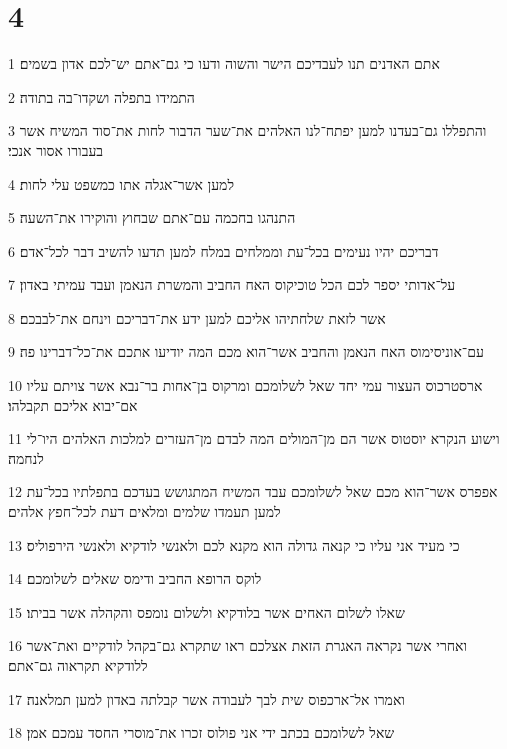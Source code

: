 \chapter{4}

\par 1 אתם האדנים תנו לעבדיכם הישר והשוה ודעו כי גם־אתם יש־לכם אדון בשמים׃
\par 2 התמידו בתפלה ושקדו־בה בתודה׃
\par 3 והתפללו גם־בעדנו למען יפתח־לנו האלהים את־שער הדבור לחות את־סוד המשיח אשר בעבורו אסור אנכי׃
\par 4 למען אשר־אגלה אתו כמשפט עלי לחות׃
\par 5 התנהגו בחכמה עם־אתם שבחוץ והוקירו את־השעה׃
\par 6 דבריכם יהיו נעימים בכל־עת וממלחים במלח למען תדעו להשיב דבר לכל־אדם׃
\par 7 על־אדותי יספר לכם הכל טוכיקוס האח החביב והמשרת הנאמן ועבד עמיתי באדון׃
\par 8 אשר לזאת שלחתיהו אליכם למען ידע את־דבריכם וינחם את־לבבכם׃
\par 9 עם־אוניסימוס האח הנאמן והחביב אשר־הוא מכם המה יודיעו אתכם את־כל־דברינו פה׃
\par 10 ארסטרכוס העצור עמי יחד שאל לשלומכם ומרקוס בן־אחות בר־נבא אשר צויתם עליו אם־יבוא אליכם תקבלהו׃
\par 11 וישוע הנקרא יוסטוס אשר הם מן־המולים המה לבדם מן־העזרים למלכות האלהים היו־לי לנחמה׃
\par 12 אפפרס אשר־הוא מכם שאל לשלומכם עבד המשיח המתגושש בעדכם בתפלתיו בכל־עת למען תעמדו שלמים ומלאים דעת לכל־חפץ אלהים׃
\par 13 כי מעיד אני עליו כי קנאה גדולה הוא מקנא לכם ולאנשי לודקיא ולאנשי הירפוליס׃
\par 14 לוקס הרופא החביב ודימס שאלים לשלומכם׃
\par 15 שאלו לשלום האחים אשר בלודקיא ולשלום נומפס והקהלה אשר בביתו׃
\par 16 ואחרי אשר נקראה האגרת הזאת אצלכם ראו שתקרא גם־בקהל לודקיים ואת־אשר ללודקיא תקראוה גם־אתם׃
\par 17 ואמרו אל־ארכפוס שית לבך לעבודה אשר קבלתה באדון למען תמלאנה׃
\par 18 שאל לשלומכם בכתב ידי אני פולוס זכרו את־מוסרי החסד עמכם אמן׃


